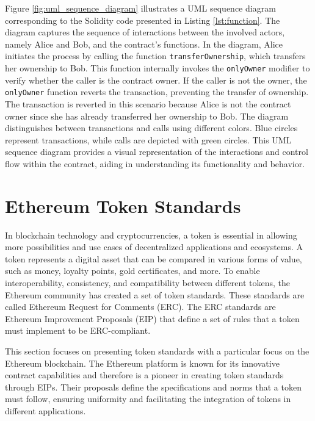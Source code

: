 Figure \ref{fig:uml_sequence_diagram} illustrates a UML sequence diagram corresponding to the Solidity code presented in Listing \ref{lst:function}. The diagram captures 
the sequence of interactions between the involved actors, namely Alice and Bob, and the contract's functions.
In the diagram, Alice initiates the process by calling the function \texttt{transferOwnership}, which transfers her ownership to Bob. This function internally invokes the 
\texttt{onlyOwner} modifier to verify whether the caller is the contract owner. If the caller is not the owner, the \texttt{onlyOwner} function reverts the transaction, 
preventing the transfer of ownership. The transaction is reverted in this scenario because Alice is not the contract owner since she has already transferred her ownership to Bob.
The diagram distinguishes between transactions and calls using different colors. Blue circles represent transactions, while calls are depicted with green circles.
This UML sequence diagram provides a visual representation of the interactions and control flow within the contract, aiding in understanding its functionality and behavior.



\section{Ethereum Token Standards}
\label{sec:ch2_ethereum_token_standards}

In blockchain technology and cryptocurrencies, a token is essential in allowing more possibilities and use cases of decentralized
applications and ecosystems. A token represents a digital asset that can be compared in various forms of value, such as money, loyalty points, gold certificates, and more.
To enable interoperability, consistency, and compatibility between different tokens, the Ethereum community has created a set of token standards.
These standards are called Ethereum Request for Comments (ERC). The ERC standards are Ethereum Improvement Proposals (EIP) that define a set of rules
that a token must implement to be ERC-compliant.


This section focuses on presenting token standards with a particular focus on the Ethereum blockchain. The Ethereum platform is
known for its innovative contract capabilities and therefore is a pioneer in creating token standards through EIPs.
Their proposals define the specifications and norms that a token must follow, ensuring uniformity and facilitating the integration
of tokens in different applications.


